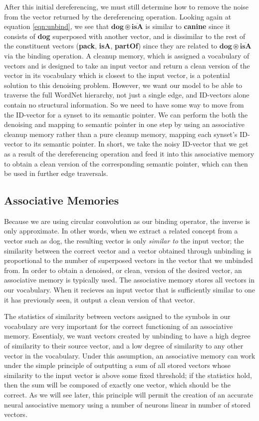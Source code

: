 \documentclass[10pt,letterpaper]{article}
\begin{document}
After this initial dereferencing, we must still determine how to remove the noise from the vector returned by the dereferencing operation. Looking again at equation \eqref{eqn:unbind}, we see that $\mathbf{dog \circledast \overline{isA}}$ is similar to \textbf{canine} since it consists of \textbf{dog} superposed with another vector, and is dissimilar to the rest of the constituent vectors (\textbf{pack}, \textbf{isA}, \textbf{partOf}) since they are related to $\mathbf{dog \circledast \overline{isA}}$ via the binding operation. A cleanup memory, which is assigned a vocabulary of vectors and is designed to take an input vector and return a clean version of the vector in its vocabulary which is closest to the input vector, is a potential solution to this denoising problem. However, we want our model to be able to traverse the full WordNet hierarchy, not just a single edge, and ID-vectors alone contain no structural information. So we need to have some way to move from the ID-vector for a synset to its semantic pointer. We can perform the both the denoising and mapping to semantic pointer in one step by using an associative cleanup memory rather than a pure cleanup memory, mapping each synset's ID-vector to its semantic pointer. In short, we take the noisy ID-vector that we get as a result of the dereferencing operation and feed it into this associative memory to obtain a clean version of the corresponding semantic pointer, which can then be used in further edge traversals.

\subsection{Associative Memories}
Because we are using circular convolution as our binding operator, the inverse is only approximate. In other words, when we extract a related concept from a vector such as dog, the resulting vector is only \textit{similar to} the input vector; the similarity between the correct vector and a vector obtained through unbinding is proportional to the number of superposed vectors in the vector that we unbinded from. In order to obtain a denoised, or clean, version of the desired vector, an associative memory is typically used. The associative memory stores all vectors in our vocabulary. When it recieves an input vector that is sufficiently similar to one it has previously seen, it output a clean version of that vector.

The statistics of similarity between vectors assigned to the symbols in our vocabulary are very important for the correct functioning of an associative memory. Essentialy, we want vectors created by unbinding to have a high degree of similarity to their source vector, and a low degree of similarity to any other vector in the vocabulary. Under this assumption, an associative memory can work under the simple principle of outputting a sum of all stored vectors whose similarity to the input vector is above some fixed threshold; if the statistics hold, then the sum will be composed of exactly one vector, which should be the correct. As we will see later, this principle will permit the creation of an accurate neural associative memory using a number of neurons linear in number of stored vectors.
\end{document}
